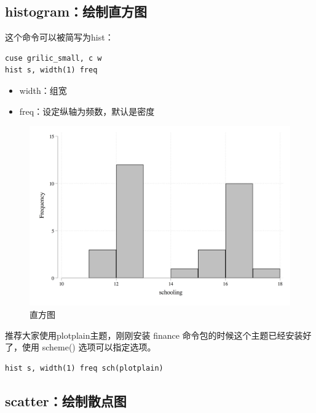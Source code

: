 \subsection{histogram：绘制直方图}

这个命令可以被简写为hist：

\begin{lstlisting}
cuse grilic_small, c w
hist s, width(1) freq
\end{lstlisting}

\begin{itemize}
\item  width：组宽
\item  freq：设定纵轴为频数，默认是密度
\end{itemize}

\begin{figure}[htbp]
  \centering
  \includegraphics[width=\textwidth]{assets/hist.png}
  \caption{直方图}
  \label{fig:hist}
\end{figure}

\begin{remark}
推荐大家使用plotplain主题，刚刚安装 finance 命令包的时候这个主题已经安装好了，使用 scheme() 选项可以指定选项。
\end{remark}

\begin{lstlisting}
hist s, width(1) freq sch(plotplain)
\end{lstlisting}

\subsection{scatter：绘制散点图}

